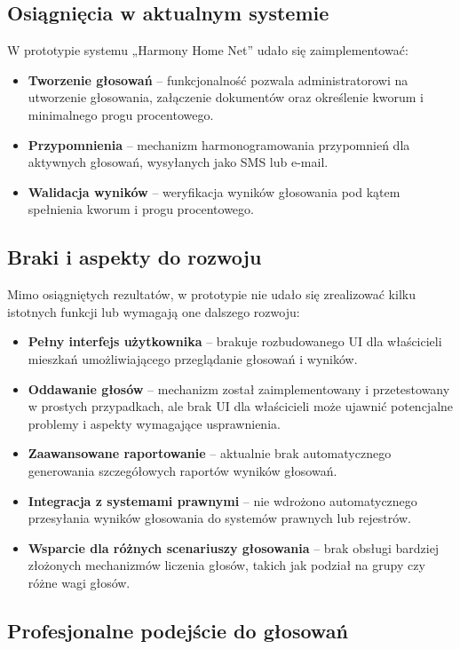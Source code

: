 \subsection{Osiągnięcia w aktualnym systemie}

W prototypie systemu „Harmony Home Net” udało się zaimplementować:
\begin{itemize}
    \item \textbf{Tworzenie głosowań} -- funkcjonalność pozwala administratorowi na utworzenie głosowania, załączenie dokumentów oraz określenie kworum i minimalnego progu procentowego.
    \item \textbf{Przypomnienia} -- mechanizm harmonogramowania przypomnień dla aktywnych głosowań, wysyłanych jako SMS lub e-mail.
    \item \textbf{Walidacja wyników} -- weryfikacja wyników głosowania pod kątem spełnienia kworum i progu procentowego.
\end{itemize}

\subsection{Braki i aspekty do rozwoju}

Mimo osiągniętych rezultatów, w prototypie nie udało się zrealizować kilku istotnych funkcji lub wymagają one dalszego rozwoju:
\begin{itemize}
    \item \textbf{Pełny interfejs użytkownika} -- brakuje rozbudowanego UI dla właścicieli mieszkań umożliwiającego przeglądanie głosowań i wyników.
    \item \textbf{Oddawanie głosów} -- mechanizm został zaimplementowany i przetestowany w prostych przypadkach, ale brak UI dla właścicieli może ujawnić potencjalne problemy i aspekty wymagające usprawnienia.
    \item \textbf{Zaawansowane raportowanie} -- aktualnie brak automatycznego generowania szczegółowych raportów wyników głosowań.
    \item \textbf{Integracja z systemami prawnymi} -- nie wdrożono automatycznego przesyłania wyników głosowania do systemów prawnych lub rejestrów.
    \item \textbf{Wsparcie dla różnych scenariuszy głosowania} -- brak obsługi bardziej złożonych mechanizmów liczenia głosów, takich jak podział na grupy czy różne wagi głosów.
\end{itemize}

\subsection{Profesjonalne podejście do głosowań}

